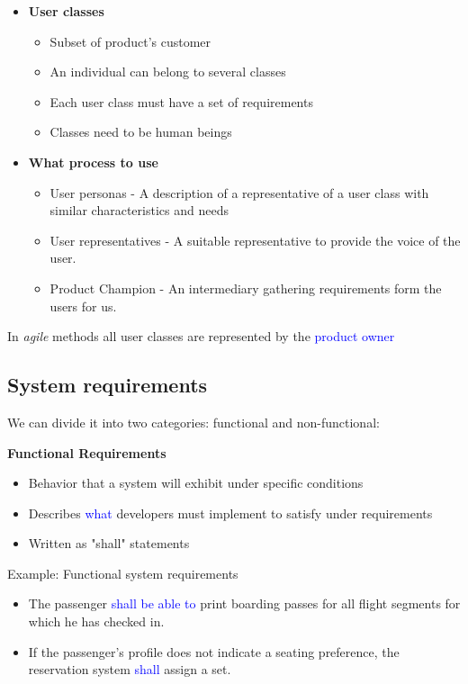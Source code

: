 \begin{itemize}
	\item \textbf{User classes}
		\begin{itemize}
			\item Subset of product's customer
			\item An individual can belong to several classes
			\item Each user class must have a set of requirements 
			\item Classes need to be human beings
		\end{itemize} 
	\item \textbf{What process to use}
		\begin{itemize}
			\item User personas - A description of a representative of a user class with similar characteristics and needs
			\item User representatives - A suitable representative to provide the voice of the user.
			\item Product Champion - An intermediary gathering requirements form the users for us.
		\end{itemize}
\end{itemize}

In \emph{agile} methods all user classes are represented by the \textcolor{blue}{product owner} 

\subsection{System requirements}
We can divide it into two categories: functional and non-functional:

\textbf{Functional Requirements}
\begin{itemize}
	\item Behavior that a system will exhibit under specific conditions
	\item Describes \textcolor{blue}{what} developers must implement to satisfy under requirements
	\item Written as "shall" statements
\end{itemize}

\begin{example}{Example: Functional system requirements}
	\begin{itemize}
		\item The passenger \textcolor{blue}{shall be able to} print boarding passes for all flight segments for which he has checked in.
		\item If the passenger's profile does not indicate a seating preference, the reservation system \textcolor{blue}{shall} assign a set.
	\end{itemize}
\end{example}	 

